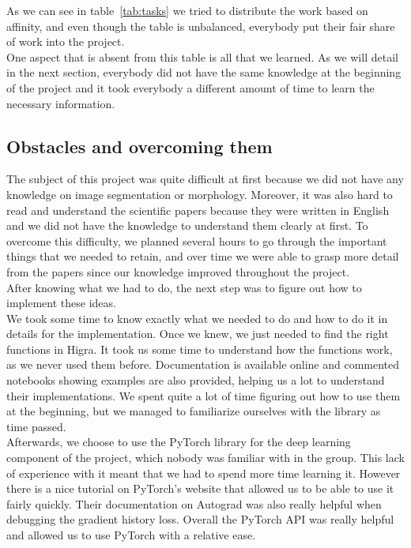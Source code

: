 As we can see in table~\ref{tab:tasks} we tried to distribute the work based on
affinity, and even though the table is unbalanced, everybody put their fair
share of work into the project.\\

One aspect that is absent from this table is all that we learned.
As we will detail in the next section, everybody did not have the same knowledge
at the beginning of the project and it took everybody a different amount of
time to learn the necessary information.\\

\subsection{Obstacles and overcoming them}

The subject of this project was quite difficult at first because we did not have
any knowledge on image segmentation or morphology. Moreover, it was also hard to read and
understand the scientific papers because they were written in English and
we did not have the knowledge to understand them clearly at first. To overcome this difficulty, we planned several
hours to go through the important things that we needed to retain, and over
time we were able to grasp more detail from the papers since our knowledge
improved throughout the project.\\

After knowing what we had to do, the next step was to figure out how to implement
these ideas.\\
We took some time to know exactly what we needed to do and how to do it in details for the implementation.
Once we knew, we just needed to find the right functions in Higra.
It took us some time to understand how the functions work, as we never used them before.
Documentation is available online and commented notebooks showing examples 
are also provided, helping us a lot to understand their implementations. 
We spent quite a lot of time figuring out how to use them at the beginning, 
but we managed to familiarize ourselves with the library as time passed.\\

Afterwards, we choose to use the PyTorch library for the deep learning
component of the project, which nobody was familiar with in the group. 
This lack of experience with it meant that we had to spend more time learning
it. However there is a nice tutorial on PyTorch's website that allowed us to
be able to use it fairly quickly. Their documentation on Autograd was also
really helpful when debugging the gradient history loss. Overall the PyTorch
API was really helpful and allowed us to use PyTorch with a relative ease.\\

